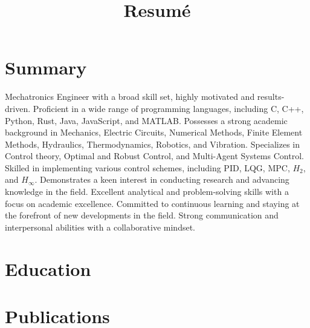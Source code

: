 \documentclass[12pt, a4paper]{moderncv}
\title{Resumé}
\newcommand\x{0.2} %
\newcommand\y{0.1}
\begin{document}
  \makecvtitle
  
  \section{Summary}
 {\justifying Mechatronics Engineer with a broad skill set, highly motivated and results-driven. Proficient in a wide range of programming languages, including C, C++, Python, Rust, Java, JavaScript, and MATLAB. Possesses a strong academic background in Mechanics, Electric Circuits, Numerical Methods, Finite Element Methods, Hydraulics, Thermodynamics, Robotics, and Vibration. Specializes in Control theory, Optimal and Robust Control, and Multi-Agent Systems Control. Skilled in implementing various control schemes, including PID, LQG, MPC, $H_2$, and $H_\infty$. Demonstrates a keen interest in conducting research and advancing knowledge in the field. Excellent analytical and problem-solving skills with a focus on academic excellence. Committed to continuous learning and staying at the forefront of new developments in the field. Strong communication and interpersonal abilities with a collaborative mindset.}
 
 \vspace{\y cm}
 
 
  \section{Education}
  \vspace{\x cm}
   \vspace{\y cm}
  
  \section{Publications}
  
\end{document}
